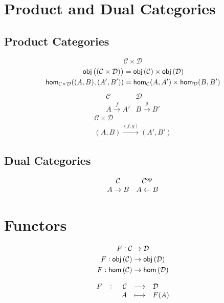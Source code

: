 \documentclass[11pt,openany]{article}
\begin{document}
\vfill
\section{Product and Dual Categories}

\subsection{Product Categories}
\[
\mathcal{C}\times\mathcal{D}
\]
\begin{align*}
\mathsf{obj}\left((\mathcal{C}\times\mathcal{D})\right)&=\mathsf{obj}\left(\mathcal{C}\right)\times\mathsf{obj}\left(\mathcal{D}\right)\\
\mathsf{hom}_{\mathcal{C}\times\mathcal{D}}((A,B),(A',B'))&=\mathsf{hom}_{\mathcal{C}}(A,A')\times\mathsf{hom}_{\mathcal{D}}(B,B')
\end{align*}
\[\begin{array}{cc}
	\mathcal{C} &\mathcal{D} \\ A\xrightarrow{f}A' & B\xrightarrow{g}B'
\end{array}\]
\[\begin{array}{c}
	\mathcal{C} \times\mathcal{D} \\ (A,B)\xrightarrow{(f,g)}(A',B')
\end{array}\]

\subsection{Dual Categories}
\[\begin{array}{cc}
	\mathcal{C} & \mathcal{C}^{\textnormal{op}} \\ A\to B & A\leftarrow B
\end{array}\]

\newpage
\section{Functors}
\begin{align*}
	F:\mathcal{C}&\to\mathcal{D}\\
	F:\mathsf{obj}\left(\mathcal{C}\right)&\to\mathsf{obj}\left(\mathcal{D}\right)\\
	F:\mathsf{hom}\left(\mathcal{C}\right)&\to\mathsf{hom}\left(\mathcal{D}\right)\\
\end{align*}

\[
\fullfunction{F}{\category}{\mathcal{D}}{A}{F(A)}
\]
\end{document}
